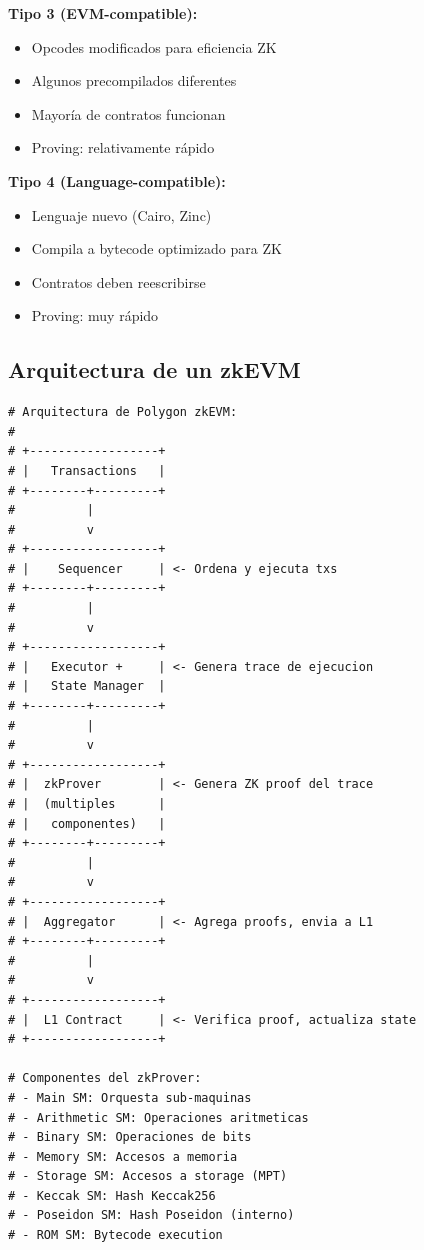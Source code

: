 \documentclass[11pt,a4paper,twoside]{book}
\begin{document}
\begin{mathnote}
\textbf{Tipo 3 (EVM-compatible):}
\begin{itemize}
    \item Opcodes modificados para eficiencia ZK
    \item Algunos precompilados diferentes
    \item Mayor\'ia de contratos funcionan
    \item Proving: relativamente r\'apido
\end{itemize}

\textbf{Tipo 4 (Language-compatible):}
\begin{itemize}
    \item Lenguaje nuevo (Cairo, Zinc)
    \item Compila a bytecode optimizado para ZK
    \item Contratos deben reescribirse
    \item Proving: muy r\'apido
\end{itemize}
\end{mathnote}

\subsection{Arquitectura de un zkEVM}

\begin{example}
\begin{lstlisting}[style=python]
# Arquitectura de Polygon zkEVM:
#
# +------------------+
# |   Transactions   |
# +--------+---------+
#          |
#          v
# +------------------+
# |    Sequencer     | <- Ordena y ejecuta txs
# +--------+---------+
#          |
#          v
# +------------------+
# |   Executor +     | <- Genera trace de ejecucion
# |   State Manager  |
# +--------+---------+
#          |
#          v
# +------------------+
# |  zkProver        | <- Genera ZK proof del trace
# |  (multiples      |
# |   componentes)   |
# +--------+---------+
#          |
#          v
# +------------------+
# |  Aggregator      | <- Agrega proofs, envia a L1
# +--------+---------+
#          |
#          v
# +------------------+
# |  L1 Contract     | <- Verifica proof, actualiza state
# +------------------+

# Componentes del zkProver:
# - Main SM: Orquesta sub-maquinas
# - Arithmetic SM: Operaciones aritmeticas
# - Binary SM: Operaciones de bits
# - Memory SM: Accesos a memoria
# - Storage SM: Accesos a storage (MPT)
# - Keccak SM: Hash Keccak256
# - Poseidon SM: Hash Poseidon (interno)
# - ROM SM: Bytecode execution
\end{lstlisting}
\end{example}
\end{document}
